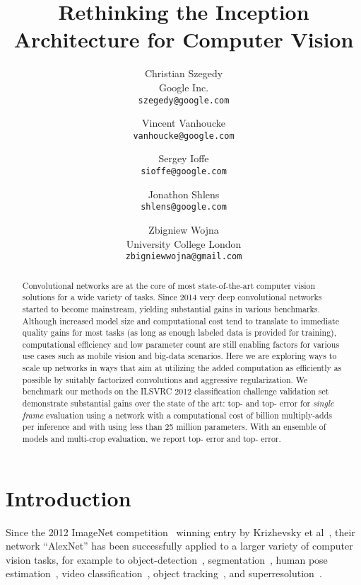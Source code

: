 \documentclass[10pt,twocolumn,letterpaper]{article}
\begin{document}
\title{Rethinking the Inception Architecture for Computer Vision}

\author{Christian Szegedy\\
Google Inc.\\
{\tt\small szegedy@google.com}
\and
Vincent Vanhoucke\\
{\tt\small vanhoucke@google.com}
\and
Sergey Ioffe\\
{\tt\small sioffe@google.com}
\and
Jonathon Shlens\\
{\tt\small shlens@google.com}
\and
Zbigniew Wojna\\
University College London\\
{\tt\small zbigniewwojna@gmail.com}
}


\maketitle


\begin{abstract}
Convolutional networks are at the core of most state-of-the-art
computer vision solutions for a wide variety of tasks.
Since 2014 very deep convolutional networks started to become
mainstream, yielding substantial gains in various benchmarks.
Although increased model size and computational cost tend to
translate to immediate quality gains for most tasks (as long as enough
labeled data is provided for training), computational efficiency and
low parameter count are still enabling factors for various use
cases such as mobile vision and big-data scenarios.
Here we are exploring ways to scale up networks in ways that aim at
utilizing the added computation as efficiently as possible by
suitably factorized convolutions and aggressive regularization.
We benchmark our methods on the ILSVRC 2012 classification challenge
validation set demonstrate substantial gains over the state of the art:
 top- and  top- error for {\it single frame}
evaluation using a network with a computational cost of  billion
multiply-adds per inference and with using less than 25 million
parameters. With an ensemble of  models and multi-crop
evaluation, we report  top- error and 
top- error.
 \end{abstract}

\section{Introduction}

Since the 2012 ImageNet competition~\cite{russakovsky2014imagenet}
winning entry by Krizhevsky et al~\cite{krizhevsky2012imagenet},
their network ``AlexNet'' has been successfully applied to a larger variety of
computer vision tasks, for example to object-detection~\cite{girshick2014rcnn},
segmentation~\cite{long2015fully}, human pose estimation~\cite{toshev2014deeppose},
video classification~\cite{karpathy2014large}, object
tracking~\cite{wang2013learning}, and superresolution~\cite{dong2014learning}.
\end{document}
